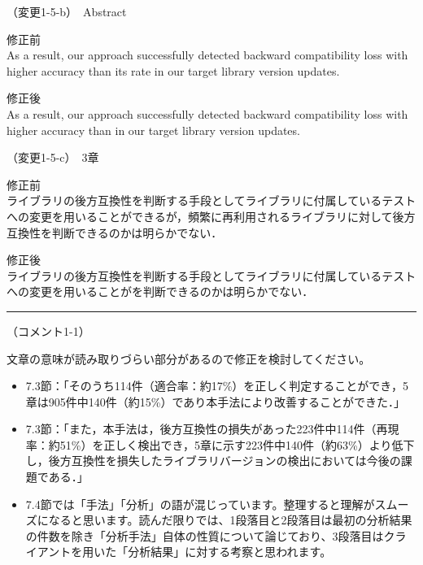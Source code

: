 \documentclass{jarticle} %
\def\subsection#1{ \vspace{1pc} {\gt #1} }
\def\nextans{ \vspace{2pc} \hrule }
\begin{document}
\subsection{（変更1-5-b）　Abstract}
\vspace{-0.3cm}
\begin{description}
\item 修正前\\
\phantom{　}
As a result, our approach successfully detected backward compatibility loss with higher accuracy than its rate in our target library version updates.
\vspace{-0.3cm}
\item 修正後\\
\phantom{　}
As a result, our approach successfully detected backward compatibility loss with higher accuracy than \textcolor{red}{} in our target library version updates.
\end{description}

\subsection{（変更1-5-c）　3章}
\vspace{-0.3cm}
\begin{description}
\item 修正前\\
\phantom{　}
ライブラリの後方互換性を判断する手段としてライブラリに付属しているテストへの変更を用いることができるが，頻繁に再利用されるライブラリに対して後方互換性を判断できるのかは明らかでない．
\vspace{-0.3cm}
\item 修正後\\
\phantom{　}
ライブラリの後方互換性を判断する手段としてライブラリに付属しているテストへの変更を用いることが\textcolor{red}{}を判断できるのかは明らかでない．
\end{description}

\newpage
\nextans
\subsection{（コメント1-1）}

文章の意味が読み取りづらい部分があるので修正を検討してください。
\begin{itemize}
\item 7.3節：「そのうち114件（適合率：約17\%）を正しく判定することができ，5章は905件中140件（約15\%）であり本手法により改善することができた．」
\item 7.3節：「また，本手法は，後方互換性の損失があった223件中114件（再現率：約51\%）を正しく検出でき，5章に示す223件中140件（約63\%）より低下し，後方互換性を損失したライブラリバージョンの検出においては今後の課題である．」
\item 7.4節では「手法」「分析」の語が混じっています。整理すると理解がスムーズになると思います。読んだ限りでは、1段落目と2段落目は最初の分析結果の件数を除き「分析手法」自体の性質について論じており、3段落目はクライアントを用いた「分析結果」に対する考察と思われます。
\end{itemize}
\end{document}
